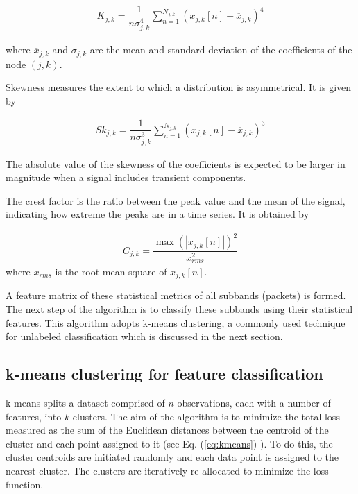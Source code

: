 \documentclass[preprint, linenumbers]{revtex4-2}
\newcommand{\km}{k-means }
\newcommand{\eq}[1]{Eq. {(#1)} }
\begin{document}
\begin{align}
	\label{eq:kurtosis}                                                                        
	K_{j,k} = \dfrac{1}{n\sigma_{j,k}^4} \sum_{n=1}^{N_{j,k}}(x_{j,k}[n]-\overline{x}_{j,k})^4 
\end{align}

\noindent where $\overline{x}_{j,k}$ and $\sigma_{j,k}$ are the mean and standard deviation of the coefficients of the node $(j,k)$. 

Skewness measures the extent to which a distribution is asymmetrical. It is given by

\begin{align}
	\label{eq:skewness}                                                                         
	Sk_{j,k} = \dfrac{1}{n\sigma_{j,k}^3} \sum_{n=1}^{N_{j,k}}(x_{j,k}[n]-\overline{x}_{j,k})^3 
\end{align}

\noindent The absolute value of the skewness of the coefficients is expected to be larger in magnitude when a signal includes transient components.

The crest factor is the ratio between the peak value and the mean of the signal, indicating how extreme the peaks are in a time series. It is obtained by

\begin{align}
	\label{eq:crest_factor}                                                       
	C_{j,k} = \dfrac{{\max{(\left\lvert x_{j,k}[n] \right\rvert )}}^2}{x_{rms}^2} 
\end{align}
\noindent where $x_{rms}$ is the root-mean-square of $x_{j,k}[n]$.

A feature matrix of these statistical metrics of all subbands (packets) is formed. The next step of the algorithm is to classify these subbands using their statistical features. This algorithm adopts \km clustering, a commonly used technique for unlabeled classification  \cite{yiakopoulos2011, shete2013} which is discussed in the next section. 

\subsection{\km clustering for feature classification}
\label{sec:k-means_intro}
\km splits a dataset comprised of $n$ observations, each with a number of features, into $k$ clusters. The aim of the algorithm is to minimize the total loss measured as the sum of the Euclidean distances between the centroid of the cluster and each point assigned to it (see \eq{\ref{eq:kmeans}}). To do this, the cluster centroids are initiated randomly and each data point is assigned to the nearest cluster. The clusters are iteratively re-allocated to minimize the loss function. 
\end{document}
